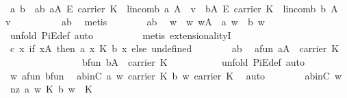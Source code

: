 \begin{isabellebody}
\ \isamarkupfalse%
\ a\ b\ \ ab{\isacharcolon}\ {\isachardoublequoteopen}a{\isasymin}A\ {\isasymrightarrow}\isactrlsub E\ carrier\ K\ {\isasymand}\ lincomb\ a\ A\ {\isacharequal}\ v\ {\isasymand}\ b{\isasymin}A\ {\isasymrightarrow}\isactrlsub E\ carrier\ K\ {\isasymand}\ lincomb\ b\ A\ {\isacharequal}\ v\ \isanewline
\ \ \ \ \ \ \ \ {\isasymand}\ a{\isasymnoteq}b{\isachardoublequoteclose}\ \isamarkupfalse%
\ metis\isanewline
\ \ \ \ \ \ \isamarkupfalse%
\ ab\ \isamarkupfalse%
\ w\ \ w{\isacharcolon}\ {\isachardoublequoteopen}w{\isasymin}A\ {\isasymand}\ a\ w\ {\isasymnoteq}\ b\ w{\isachardoublequoteclose}\ \isamarkupfalse%
\ {\isacharparenleft}unfold\ PiE{\isacharunderscore}def{\isacharcomma}\ auto{\isacharparenright}\isanewline
\ \ \ \ \ \ \ \ \isamarkupfalse%
\ {\isacharparenleft}metis\ extensionalityI{\isacharparenright}\isanewline
\ \ \ \ \ \ \isamarkupfalse%
\ {\isacharquery}c{\isacharequal}{\isachardoublequoteopen}{\isasymlambda}\ x{\isachardot}\ {\isacharparenleft}if\ x{\isasymin}A\ then\ {\isacharparenleft}{\isacharparenleft}a\ x{\isacharparenright}\ {\isasymominus}\isactrlbsub K\isactrlesub \ {\isacharparenleft}b\ x{\isacharparenright}{\isacharparenright}\ else\ undefined{\isacharparenright}{\isachardoublequoteclose}\isanewline
\ \ \ \ \ \ \isamarkupfalse%
\ ab\ \isamarkupfalse%
\ a{\isacharunderscore}fun{\isacharcolon}\ {\isachardoublequoteopen}a{\isasymin}A\ {\isasymrightarrow}\ carrier\ K{\isachardoublequoteclose}\ \isanewline
\ \ \ \ \ \ \ \ \ \ \ \ \ \ \ \ b{\isacharunderscore}fun{\isacharcolon}\ {\isachardoublequoteopen}b{\isasymin}A\ {\isasymrightarrow}\ carrier\ K{\isachardoublequoteclose}\ \isanewline
\ \ \ \ \ \ \ \ \isamarkupfalse%
\ {\isacharparenleft}unfold\ PiE{\isacharunderscore}def{\isacharcomma}\ auto{\isacharparenright}\isanewline
\ \ \ \ \ \ \isamarkupfalse%
\ w\ a{\isacharunderscore}fun\ b{\isacharunderscore}fun\ \isamarkupfalse%
\ abinC{\isacharcolon}\ {\isachardoublequoteopen}a\ w\ {\isasymin}carrier\ K{\isachardoublequoteclose}\ {\isachardoublequoteopen}b\ w\ {\isasymin}carrier\ K{\isachardoublequoteclose}\ \isamarkupfalse%
\ auto\isanewline
\isanewline
\ \ \ \ \ \ \isamarkupfalse%
\ abinC\ w\ \isamarkupfalse%
\ nz{\isacharcolon}\ {\isachardoublequoteopen}a\ w\ {\isasymominus}\isactrlbsub K\isactrlesub \ b\ w\ {\isasymnoteq}\ {\isasymzero}\isactrlbsub K\isactrlesub {\isachardoublequoteclose}\ \isanewline

\end{isabellebody}
